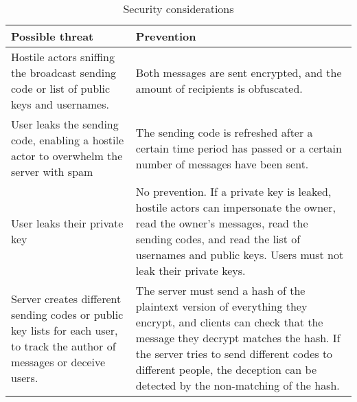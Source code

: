 \documentclass{article}
\begin{document}
\begin{table}[H]
    \centering
    \caption{Security considerations}
    \vspace{0.2cm}
    \begin{tabular}{p{}p{}}
    \toprule
    \textbf{Possible threat} & \textbf{Prevention}\\
    \midrule
    Hostile actors sniffing the broadcast sending code or list of public keys and usernames. & Both messages are sent encrypted, and the amount of recipients is obfuscated.\\
    \midrule
    User leaks the sending code, enabling a hostile actor to overwhelm the server with spam & The sending code is refreshed after a certain time period has passed or a certain number of messages have been sent.\\
    \midrule
    User leaks their private key & No prevention. If a private key is leaked, hostile actors can impersonate the owner, read the owner's messages, read the sending codes, and read the list of usernames and public keys. Users must not leak their private keys.\\
    \midrule
    Server creates different sending codes or public key lists for each user, to track the author of messages or deceive users. & The server must send a hash of the plaintext version of everything they encrypt, and clients can check that the message they decrypt matches the hash. If the server tries to send different codes to different people, the deception can be detected by the non-matching of the hash.\\
    \bottomrule
    \end{tabular}
    \label{tab:secconsauth}
\end{table}
\end{document}
